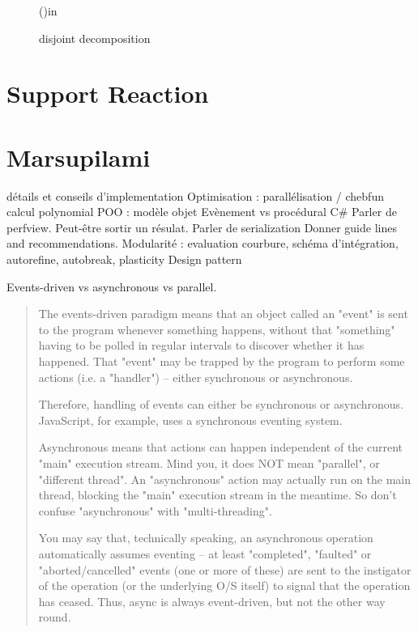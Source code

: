 \begin{figure}[p]
\begin{fullpage}
\begin{algorithm}[H]
{\BlankLine
{}
\ForEach(){\Node in \Model}{
	
	
}
\BlankLine
{}

}{\KwRet}

\caption{disjoint decomposition}\label{algo_disjdecomp}
\end{algorithm}
\end{fullpage}
\end{figure}
\DecMargin{2em}


\section{Support Reaction}

\section{Marsupilami}
détails et conseils d'implementation
Optimisation : parallélisation / chebfun calcul polynomial
POO : modèle objet
Evènement vs procédural
C\#
Parler de perfview. Peut-être sortir un résulat. 
Parler de serialization
Donner guide lines and recommendations.
Modularité : evaluation courbure, schéma d'intégration, autorefine, autobreak, plasticity
Design pattern

Events-driven vs asynchronous vs parallel.

\blockquote{The events-driven paradigm means that an object called an "event" is sent to the program whenever something happens, without that "something" having to be polled in regular intervals to discover whether it has happened. That "event" may be trapped by the program to perform some actions (i.e. a "handler") -- either synchronous or asynchronous. 

Therefore, handling of events can either be synchronous or asynchronous. JavaScript, for example, uses a synchronous eventing system.

Asynchronous means that actions can happen independent of the current "main" execution stream. Mind you, it does NOT mean "parallel", or "different thread". An "asynchronous" action may actually run on the main thread, blocking the "main" execution stream in the meantime. So don't confuse "asynchronous" with "multi-threading".

You may say that, technically speaking, an asynchronous operation automatically assumes eventing -- at least "completed", "faulted" or "aborted/cancelled" events (one or more of these) are sent to the instigator of the operation (or the underlying O/S itself) to signal that the operation has ceased. Thus, async is always event-driven, but not the other way round.
}

